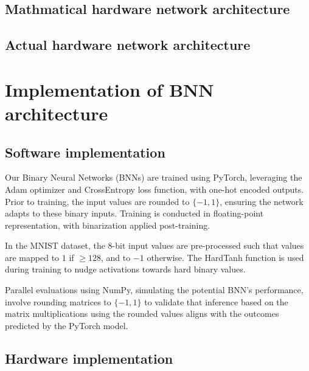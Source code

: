 \documentclass[conference,a4paper,flushend]{cs-techrep}
\begin{document}
\subsection{Mathmatical hardware network architecture}

\subsection{Actual hardware network architecture}

\section{Implementation of BNN architecture}
\subsection{Software implementation}
Our Binary Neural Networks (BNNs) are trained using PyTorch, leveraging the Adam optimizer and CrossEntropy loss function, with one-hot encoded outputs. Prior to training, the input values are rounded to \(\{-1, 1\}\), ensuring the network adapts to these binary inputs. Training is conducted in floating-point representation, with binarization applied post-training.

In the MNIST dataset, the 8-bit input values are pre-processed such that values are mapped to $1$ if $\geq 128$, and to $-1$ otherwise. The HardTanh function is used during training to nudge activations towards hard binary values. 

Parallel evaluations using NumPy, simulating the potential BNN's performance, involve rounding matrices to \(\{-1, 1\}\) to validate that inference based on the matrix multiplications using the rounded values aligns with the outcomes predicted by the PyTorch model.


\subsection{Hardware implementation}

\end{document}
